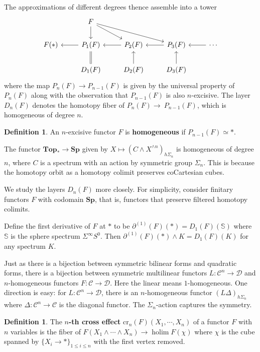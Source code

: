\documentclass[psamsfonts]{amsart}
\theoremstyle{definition}
\newtheorem{defn}[thm]{Definition}
\theoremstyle{remark}
\newcommand{\cros}{\mathrm{cr}}
\newcommand{\Sp}{\mathbf{Sp}}
\newcommand{\Top}{\mathbf{Top}}
\DeclareMathOperator{\holim}{holim}
\numberwithin{equation}{section}
\begin{document}
The approximations of different degrees thence assemble into a tower
\[\begin{tikzcd}
&F\arrow[d]\arrow[dr]\arrow[drr]\\
F(\ast)&P_1(F)\arrow[l]&P_2(F)\arrow[l]&P_3(F)\arrow[l]&\cdots\arrow[l]\\
&D_1(F)\ar[u,equal]&D_2(F)\arrow[u]&D_3(F)\arrow[u]
\end{tikzcd}\]
where the map $P_n(F)\to P_{n-1}(F)$ is given by the universal property of $P_n(F)$ along with the observation that $P_{n-1}(F)$ is also $n$-excisive. The layer $D_n(F)$ denotes the homotopy fiber of $P_n(F)\to\ P_{n-1}(F)$, which is homogeneous of degree $n$.

\begin{defn}
An $n$-excisive functor $F$ is \textbf{homogeneous} if $P_{n-1}(F)\simeq\ast$.
\end{defn}

The functor $\Top_\ast\to\Sp$ given by $X\mapsto(C\wedge X^{\wedge n})_{h\Sigma_n}$ is homogeneous of degree $n$, where $C$ is a spectrum with an action by symmetric group $\Sigma_n$. This is because the homotopy orbit as a homotopy colimit preserves coCartesian cubes.\medbreak

We study the layers $D_n(F)$ more closely. For simplicity, consider finitary functors $F$ with codomain $\Sp$, that is, functors that preserve filtered homotopy colimits.

Define the first derivative of $F$ at $\ast$ to be $\partial^{(1)}(F)(\ast)=D_1(F)(\mathbb{S})$ where $\mathbb{S}$ is the sphere spectrum $\Sigma^\infty S^0$. Then $\partial^{(1)}(F)(\ast)\wedge K=D_1(F)(K)$ for any spectrum $K$.\medbreak

Just as there is a bijection between symmetric bilinear forms and quadratic forms, there is a bijection between symmetric multilinear functors $L:\mathcal{C}^n\to\mathcal{D}$ and $n$-homogeneous functors $F:\mathcal{C}\to\mathcal{D}$. Here the linear means $1$-homogeneous. One direction is easy: for $L:\mathcal{C}^n\to\mathcal{D}$, there is an $n$-homogeneous functor $(L\Delta)_{h\Sigma_n}$ where $\Delta:\mathcal{C}^n\to\mathcal{C}$ is the diagonal functor. The $\Sigma_n$-action captures the symmetry.

\begin{defn}
The \textbf{$n$-th cross effect} $\cros_n(F)(X_1,\cdots,X_n)$ of a functor $F$ with $n$ variables is the fiber of $F(X_1\wedge\cdots\wedge X_n)\to\holim F(\chi)$ where $\chi$ is the cube spanned by $\{X_i\to\ast\}_{1\leq i\leq n}$ with the first vertex removed.
\end{defn}
\end{document}
